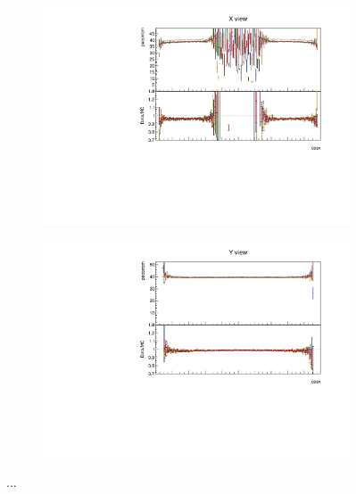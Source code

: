 \documentclass[12pt,a4paper]{article}
\begin{document}
\begin{figure}[h!]
\begin{subfigure}{0.5\textwidth}
  \end{subfigure}
  \begin{subfigure}{0.5\textwidth}
    \includegraphics[width=\linewidth]{PlotsAngularDistribution/pecorrcm_cosx_x.pdf}
  \end{subfigure}
  \begin{subfigure}{0.5\textwidth}
    \includegraphics[width=\linewidth]{PlotsAngularDistribution/pecorrcm_cosx_y.pdf}
  \end{subfigure}
  \caption{...}
  \label{figAbsCalibCosX1}
\end{figure}
\end{document}
